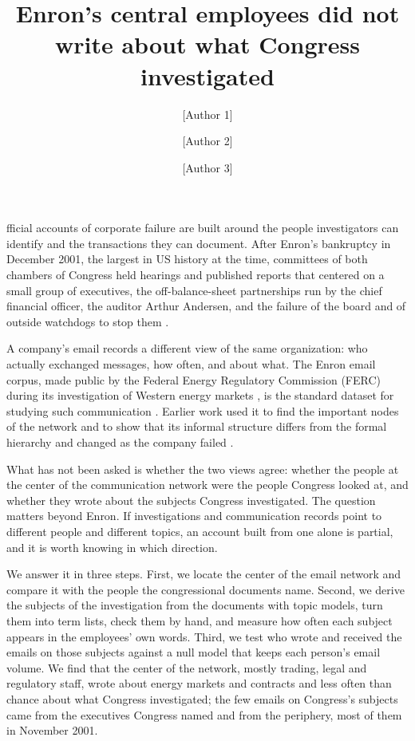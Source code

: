 \documentclass[9pt,twocolumn,twoside]{pnas-new}
\title{Enron's central employees did not write about what Congress investigated}
\author[a]{[Author 1]}
\author[a]{[Author 2]}
\author[a]{[Author 3]}
\affil[a]{DTU Compute, Technical University of Denmark, 2800 Kongens Lyngby, Denmark}
\begin{document}
\maketitle
\thispagestyle{firststyle}

fficial accounts of corporate failure are built around the people investigators
can identify and the transactions they can document. After Enron's bankruptcy in December
2001, the largest in US history at the time, committees of both chambers of Congress held
hearings and published reports that centered on a small group of executives, the
off-balance-sheet partnerships run by the chief financial officer, the auditor Arthur
Andersen, and the failure of the board and of outside watchdogs to stop them
\cite{powers2002,senate2002board,senate2002oversight}.

A company's email records a different view of the same organization: who actually exchanged
messages, how often, and about what. The Enron email corpus, made public by the Federal
Energy Regulatory Commission (FERC) during its investigation of Western energy markets
\cite{ferc2003}, is the standard dataset for studying such communication
\cite{klimt2004}. Earlier work used it to find the important nodes of the network
\cite{shetty2005} and to show that its informal structure differs from the formal hierarchy
and changed as the company failed \cite{diesner2005}.

What has not been asked is whether the two views agree: whether the people at the center of
the communication network were the people Congress looked at, and whether they wrote about
the subjects Congress investigated. The question matters beyond Enron. If investigations
and communication records point to different people and different topics, an account built
from one alone is partial, and it is worth knowing in which direction.

We answer it in three steps. First, we locate the center of the email network and compare
it with the people the congressional documents name. Second, we derive the subjects of the
investigation from the documents with topic models, turn them into term lists, check them by
hand, and measure how often each subject appears in the employees' own words. Third, we test
who wrote and received the emails on those subjects against a null model that keeps each
person's email volume. We find that the center of the network, mostly trading, legal and
regulatory staff, wrote about energy markets and contracts and less often than chance about
what Congress investigated; the few emails on Congress's subjects came from the executives
Congress named and from the periphery, most of them in November 2001.
\end{document}
